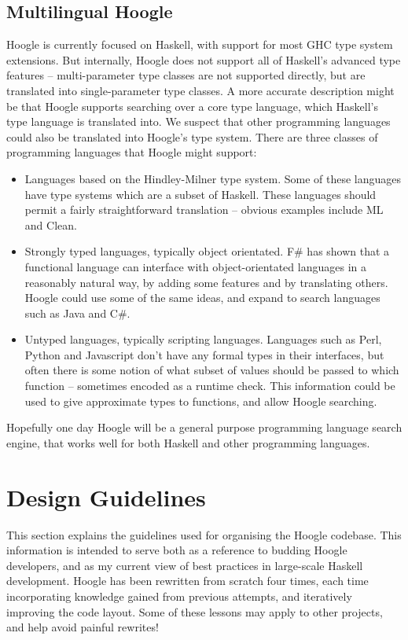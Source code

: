 \documentclass{tmr}
\begin{document}
\subsection{Multilingual Hoogle}

Hoogle is currently focused on Haskell, with support for most GHC type system extensions. But internally, Hoogle does not support all of Haskell's advanced type features -- multi-parameter type classes are not supported directly, but are translated into single-parameter type classes. A more accurate description might be that Hoogle supports searching over a core type language, which Haskell's type language is translated into. We suspect that other programming languages could also be translated into Hoogle's type system. There are three classes of programming languages that Hoogle might support:

\begin{itemize}
\item Languages based on the Hindley-Milner type system. Some of these languages have type systems which are a subset of Haskell. These languages should permit a fairly straightforward translation -- obvious examples include ML and Clean.
\item Strongly typed languages, typically object orientated. F\# has shown that a functional language can interface with object-orientated languages in a reasonably natural way, by adding some features and by translating others. Hoogle could use some of the same ideas, and expand to search languages such as Java and C\#.
\item Untyped languages, typically scripting languages. Languages such as Perl, Python and Javascript don't have any formal types in their interfaces, but often there is some notion of what subset of values should be passed to which function -- sometimes encoded as a runtime check. This information could be used to give approximate types to functions, and allow Hoogle searching.
\end{itemize}

Hopefully one day Hoogle will be a general purpose programming language search engine, that works well for both Haskell and other programming languages.

\section{Design Guidelines}

This section explains the guidelines used for organising the Hoogle codebase. This information is intended to serve both as a reference to budding Hoogle developers, and as my current view of best practices in large-scale Haskell development. Hoogle has been rewritten from scratch four times, each time incorporating knowledge gained from previous attempts, and iteratively improving the code layout. Some of these lessons may apply to other projects, and help avoid painful rewrites!
\end{document}

